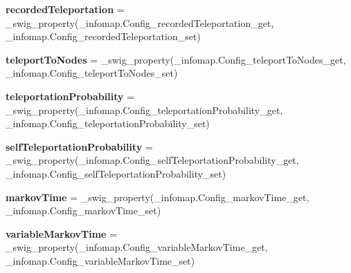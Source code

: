 \begin{DoxyCompactItemize}
\item 
\mbox{\label{classinfomapfolder_1_1infomap_1_1Config_aa65207bd672f60442d69d6a4dba36d3a}} 
{\bfseries recorded\+Teleportation} = \+\_\+swig\+\_\+property(\+\_\+infomap.\+Config\+\_\+recorded\+Teleportation\+\_\+get, \+\_\+infomap.\+Config\+\_\+recorded\+Teleportation\+\_\+set)
\item 
\mbox{\label{classinfomapfolder_1_1infomap_1_1Config_a84746754e32e8f9377a99bae48f64b68}} 
{\bfseries teleport\+To\+Nodes} = \+\_\+swig\+\_\+property(\+\_\+infomap.\+Config\+\_\+teleport\+To\+Nodes\+\_\+get, \+\_\+infomap.\+Config\+\_\+teleport\+To\+Nodes\+\_\+set)
\item 
\mbox{\label{classinfomapfolder_1_1infomap_1_1Config_ab5e40eba516e178a17731b0c7092d474}} 
{\bfseries teleportation\+Probability} = \+\_\+swig\+\_\+property(\+\_\+infomap.\+Config\+\_\+teleportation\+Probability\+\_\+get, \+\_\+infomap.\+Config\+\_\+teleportation\+Probability\+\_\+set)
\item 
\mbox{\label{classinfomapfolder_1_1infomap_1_1Config_a7db55d88f879df5d65c185f3f5511003}} 
{\bfseries self\+Teleportation\+Probability} = \+\_\+swig\+\_\+property(\+\_\+infomap.\+Config\+\_\+self\+Teleportation\+Probability\+\_\+get, \+\_\+infomap.\+Config\+\_\+self\+Teleportation\+Probability\+\_\+set)
\item 
\mbox{\label{classinfomapfolder_1_1infomap_1_1Config_aae62e10798d703b88034b7b6f2211c29}} 
{\bfseries markov\+Time} = \+\_\+swig\+\_\+property(\+\_\+infomap.\+Config\+\_\+markov\+Time\+\_\+get, \+\_\+infomap.\+Config\+\_\+markov\+Time\+\_\+set)
\item 
\mbox{\label{classinfomapfolder_1_1infomap_1_1Config_ad60f31dce46dc49dafa1cba9438d5e30}} 
{\bfseries variable\+Markov\+Time} = \+\_\+swig\+\_\+property(\+\_\+infomap.\+Config\+\_\+variable\+Markov\+Time\+\_\+get, \+\_\+infomap.\+Config\+\_\+variable\+Markov\+Time\+\_\+set)
\item 
\mbox{\label{classinfomapfolder_1_1infomap_1_1Config_a70a05d9ad189397e8afe94538a5cf912}} 

\end{DoxyCompactItemize}
